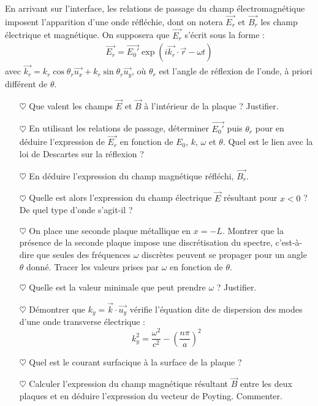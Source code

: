 \documentclass{report}
\begin{document}
En arrivant sur l'interface, les relations de passage du champ électromagnétique imposent l'apparition d'une onde réfléchie, dont on notera $\vec{E_r}$ et $\vec{B_r}$ les champ électrique et magnétique. On supposera que $\vec{E_r}$ s'écrit sous la forme : 
\begin{align*}
	\vec{E_r}=\vec{E_0'}\exp(i\vec{k_r}\cdot\vec{r}-\omega t)
\end{align*}
avec $\vec{k_r}=k_r\cos\theta_r\vec{u_x}+k_r\sin\theta_r\vec{u_y}$, où $\theta_r$ est l'angle de réflexion de l'onde, à priori différent de $\theta$.
\begin{itemize}
	
	\item[$\heartsuit$] Que valent les champs $\vec{E}$ et $\vec{B}$ à l'intérieur de la plaque ? Justifier.
	
	\item[$\heartsuit$] En utilisant les relations de passage, déterminer $\vec{E_0'}$ puis $\theta_r$ pour en déduire l'expression de $\vec{E_r}$ en fonction de $E_0$, $k$, $\omega$ et $\theta$. Quel est le lien avec la loi de Descartes sur la réflexion ?
	
	\item[$\heartsuit$] En déduire l'expression du champ magnétique réfléchi, $\vec{B_r}$.
	
	\item[$\heartsuit$] Quelle est alors l'expression du champ électrique $\vec{E}$ résultant pour $x<0$ ? De quel type d'onde s'agit-il ?
	
	\item[$\heartsuit$] 	On place une seconde plaque métallique en $x=-L$. Montrer que la présence de la seconde plaque impose une discrétisation du spectre, c'est-à-dire que seules des fréquences $\omega$ discrètes peuvent se propager pour un angle $\theta$ donné. Tracer les valeurs prises par $\omega$ en fonction de $\theta$. 
	\item[$\heartsuit$] Quelle est la valeur minimale que peut prendre $\omega$ ? Justifier. 
	
	\item[$\heartsuit$] Démontrer que $k_y=\vec{k}\cdot\vec{u_y}$ vérifie l'équation dite de dispersion des modes d'une onde transverse électrique : 
	\begin{equation}
		k_y^2=\frac{\omega^2}{c^2}-\left(\frac{n\pi}{a} \right)^2 
	\end{equation}
	
	\item[$\heartsuit$] Quel est le courant surfacique à la surface de la plaque ?
	
	\item[$\heartsuit$] Calculer l'expression du champ magnétique résultant $\vec{B}$ entre les deux plaques et en déduire l'expression du vecteur de Poyting. Commenter. 
	
\end{itemize}
\end{document}
